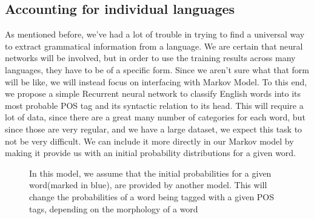 \subsection{Accounting for individual languages}
As mentioned before, we've had a lot of trouble in trying to find a universal way to extract grammatical information from a language. We are certain that
neural networks will be involved, but in order to use the training results across many languages, they have to be of a specific form. Since we aren't sure
what that form will be like, we will instead focus on interfacing with Markov Model. To this end, we propose a simple Recurrent neural network to classify
English words into its most probable POS tag and its syntactic relation to its head. This will require a lot of data, since there are a great many number of categories for each word, but since those are very regular, and we have a large dataset, we expect this task to not be very difficult. We can include it more directly
in our Markov model by making it provide us with an initial probability distributions for a given word.

\begin{figure}[h!]
\center
{}
\label{mark:synt}
\caption{In this model, we assume that the initial probabilities for a given word(marked in blue), are provided by another model. This will change the probabilities of a word being tagged with a given POS tags, depending on the morphology of a word}
\end{figure}

